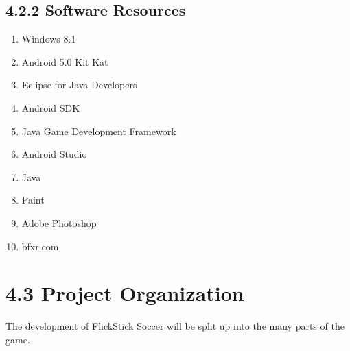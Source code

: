 \documentclass{article}
\begin{document}
\subsection{4.2.2 Software Resources}
\begin{enumerate}
\item Windows 8.1
\item Android 5.0 Kit Kat
\item Eclipse for Java Developers
\item Android SDK
\item Java Game Development Framework
\item Android Studio
\item Java
\item Paint
\item Adobe Photoshop
\item bfxr.com
\end{enumerate}

\section{4.3 Project Organization}
The development of FlickStick Soccer will be split up into the many parts of the game.
\end{document}
